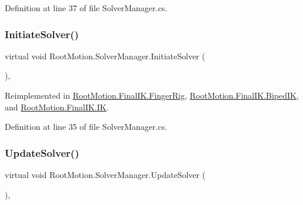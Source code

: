 Definition at line 37 of file Solver\+Manager.\+cs.

\mbox{\label{class_root_motion_1_1_solver_manager_abd2008369f3de95712d5748aa4ce6243}} 
\subsubsection{\texorpdfstring{Initiate\+Solver()}{InitiateSolver()}}
{\footnotesize\ttfamily virtual void Root\+Motion.\+Solver\+Manager.\+Initiate\+Solver (\begin{DoxyParamCaption}{ }\end{DoxyParamCaption})\hspace{0.3cm}{\ttfamily [protected]}, {\ttfamily [virtual]}}



Reimplemented in \mbox{\hyperlink{class_root_motion_1_1_final_i_k_1_1_finger_rig_aa32e72eb590a6e441ed8de3f1ce95655}{Root\+Motion.\+Final\+I\+K.\+Finger\+Rig}}, \mbox{\hyperlink{class_root_motion_1_1_final_i_k_1_1_biped_i_k_aa051dcb53a03e693210670bd530e9acd}{Root\+Motion.\+Final\+I\+K.\+Biped\+IK}}, and \mbox{\hyperlink{class_root_motion_1_1_final_i_k_1_1_i_k_a5e26500361f7eb0c6515fa84b9c68e57}{Root\+Motion.\+Final\+I\+K.\+IK}}.



Definition at line 35 of file Solver\+Manager.\+cs.

\mbox{\label{class_root_motion_1_1_solver_manager_ac7a8239a700672570da89d88544a340d}} 
\subsubsection{\texorpdfstring{Update\+Solver()}{UpdateSolver()}}
{\footnotesize\ttfamily virtual void Root\+Motion.\+Solver\+Manager.\+Update\+Solver (\begin{DoxyParamCaption}{ }\end{DoxyParamCaption})\hspace{0.3cm}{\ttfamily [protected]}, {\ttfamily [virtual]}}



